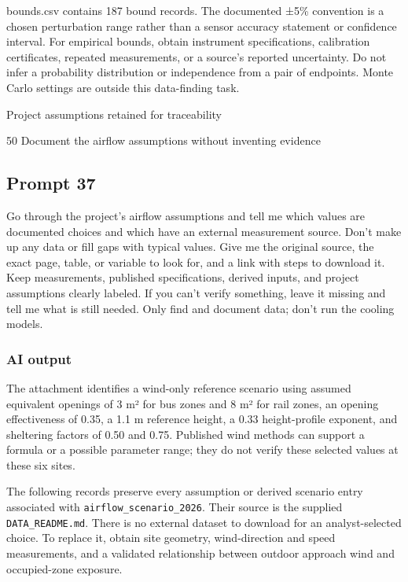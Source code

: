 bounds.csv contains 187 bound records. The documented ±5\% convention is a chosen perturbation range rather than a sensor accuracy statement or confidence interval. For empirical bounds, obtain instrument specifications, calibration certificates, repeated measurements, or a source’s reported uncertainty. Do not infer a probability distribution or independence from a pair of endpoints. Monte Carlo settings are outside this data-finding task.

Project assumptions retained for traceability

50 Document the airflow assumptions without inventing evidence

\subsection*{Prompt 37}
Go through the project’s airflow assumptions and tell me which values are documented choices and which have an external measurement source. Don’t make up any data or fill gaps with typical values. Give me the original source, the exact page, table, or variable to look for, and a link with steps to download it. Keep measurements, published specifications, derived inputs, and project assumptions clearly labeled. If you can’t verify something, leave it missing and tell me what is still needed. Only find and document data; don’t run the cooling models.

\subsubsection*{AI output}
The attachment identifies a wind-only reference scenario using assumed equivalent openings of 3 m² for bus zones and 8 m² for rail zones, an opening effectiveness of 0.35, a 1.1 m reference height, a 0.33 height-profile exponent, and sheltering factors of 0.50 and 0.75. Published wind methods can support a formula or a possible parameter range; they do not verify these selected values at these six sites.

The following records preserve every assumption or derived scenario entry associated with \nolinkurl{airflow_scenario_2026}. Their source is the supplied \nolinkurl{DATA_README.md}. There is no external dataset to download for an analyst-selected choice. To replace it, obtain site geometry, wind-direction and speed measurements, and a validated relationship between outdoor approach wind and occupied-zone exposure.


